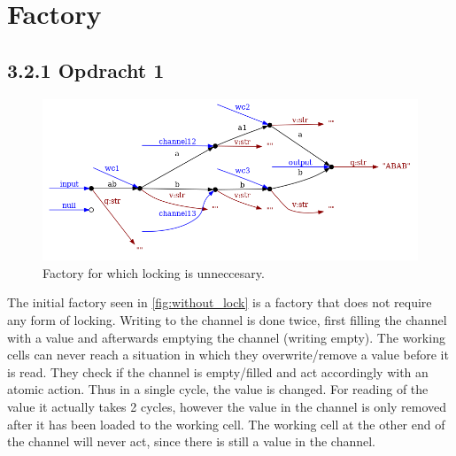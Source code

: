 \documentclass[a4paper,12px]{article}
\begin{document}
\newcommand{\Sum}[2]{\sum^{#2}_{#1}}
\newcommand{\E}[1]{{\mathbb{E}\left[#1\right]}}
\newcommand{\var}[1]{{\text{var}\left[#1\right]}}
\newcommand{\diffpart}[1]{\frac{\partial}{\partial{} #1}}
\newcommand{\?}{\stackrel{?}{=}}
\newcommand{\intinf}{\int\limits_{-\infty}^{\infty}}
\newcommand{\intnulinf}{\int\limits_{0}^{\infty}}
\newcommand{\intpi}{\int\limits_{0}^{2\pi}}
\newcommand{\argmin}[1]{\underset{#1}{\mathop{\mathrm{argmin}}}}
\newcommand{\argmax}[1]{\underset{#1}{\mathop{\mathrm{argmax}}}}


\section{Factory}

\subsection{3.2.1 Opdracht 1}

\begin{figure}[h]
    \centering
    \includegraphics[width=\linewidth]{without_lock.png}
    \caption{Factory for which locking is unneccesary.}
    \label{fig:without_lock}
\end{figure}
\FloatBarrier%

The initial factory seen in \autoref{fig:without_lock} is a factory that does
not require any form of locking. Writing to the channel is done twice, first
filling the channel with a value and afterwards emptying the channel (writing
empty). The working cells can never reach a situation in which they
overwrite/remove a value before it is read. They check if the channel is
empty/filled and act accordingly with an atomic action. Thus in a single cycle,
the value is changed. For reading of the value it actually takes 2 cycles,
however the value in the channel is only removed after it has been loaded to
the working cell. The working cell at the other end of the channel will never
act, since there is still a value in the channel.
\end{document}
